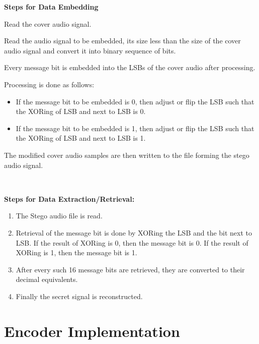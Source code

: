 \documentclass[a4paper, 12pt, notitlepage]{report}
\begin{document}
\begin{block}{\textbf{Steps for Data Embedding}}
\begin{enumerate}
  \item {
    Read the cover audio signal.  
  }
	\item {
    Read the audio signal to be embedded, its size less than the size of the cover audio signal and convert it into binary sequence of bits.
  }
	\item {
    Every message bit is embedded into the LSBs of the cover audio after processing. 
  }
	\item {
    Processing is done as follows:
		
		\begin{itemize}
			\item If the message bit to be embedded is 0, then adjust or flip the LSB such that the XORing of LSB and next to LSB is 0.
			\item If the message bit to be embedded is 1, then adjust or flip the LSB such that the XORing of LSB and next to LSB is 1.
		\end{itemize}
	\item The modified cover audio samples are then written to the file forming the stego audio signal. 	
  }
  \end{enumerate}
\end{block}\\

\begin{block}{\textbf{Steps for Data Extraction/Retrieval:}}
\begin{enumerate}
  \item {
    The Stego audio file is read.  
  }
	\item {
   Retrieval of the  message  bit  is  done  by  XORing  the LSB and the bit next to LSB. If the result of XORing is 0, then the message bit is 0. If the result of XORing is 1, then the message bit is 1. 
  }
	\item {
    After every such 16 message bits are retrieved, they are converted to their decimal equivalents. 
  }
	\item {
    Finally the secret signal is reconstructed. }
  \end{enumerate}
\end{block}



\section{Encoder Implementation}
\\
\end{document}
